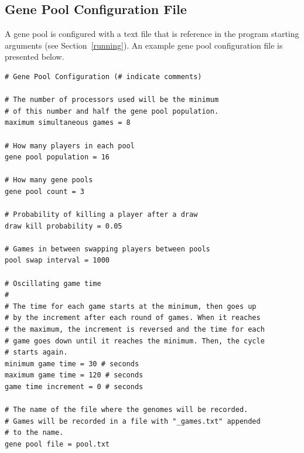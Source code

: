 \documentclass[letterpaper]{article}
\renewcommand\_{\textunderscore\allowbreak}
\begin{document}
\subsection{Gene Pool Configuration File}
A gene pool is configured with a text file that is reference in the program starting arguments (see Section~\ref{running}). An example gene pool configuration file is presented below.
\begin{verbatim}
# Gene Pool Configuration (# indicate comments)

# The number of processors used will be the minimum
# of this number and half the gene pool population.
maximum simultaneous games = 8

# How many players in each pool
gene pool population = 16

# How many gene pools
gene pool count = 3

# Probability of killing a player after a draw
draw kill probability = 0.05

# Games in between swapping players between pools
pool swap interval = 1000

# Oscillating game time
#
# The time for each game starts at the minimum, then goes up
# by the increment after each round of games. When it reaches
# the maximum, the increment is reversed and the time for each
# game goes down until it reaches the minimum. Then, the cycle
# starts again.
minimum game time = 30 # seconds
maximum game time = 120 # seconds
game time increment = 0 # seconds

# The name of the file where the genomes will be recorded.
# Games will be recorded in a file with "_games.txt" appended
# to the name.
gene pool file = pool.txt
\end{verbatim}
\end{document}
